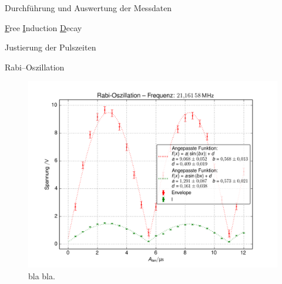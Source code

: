 \documentclass[pdftex, a4paper,11pt, twoside, ngerman]{report}
\begin{document}
\begin{chapter}{Durchführung und Auswertung der Messdaten}
\begin{section}{
        \underline{F}ree \underline{I}nduction \underline{D}ecay}
    \end{section}
    
    
    \newpage
    \begin{section}{Justierung der Pulszeiten}
      \label{chpPulszeiten}
      
      
    \end{section}
    
    
    \newpage
    \begin{section}{Rabi--Oszillation}
      \label{chpRabi}
      
      
      \begin{figure}[htb]
        \centering
        \includegraphics[width=\textwidth]{Figures/Rabi_freq1.png}
        \caption{bla bla.}
        \label{figRabifreq1}
      \end{figure}
      

\end{section}
\end{chapter}
\end{document}
